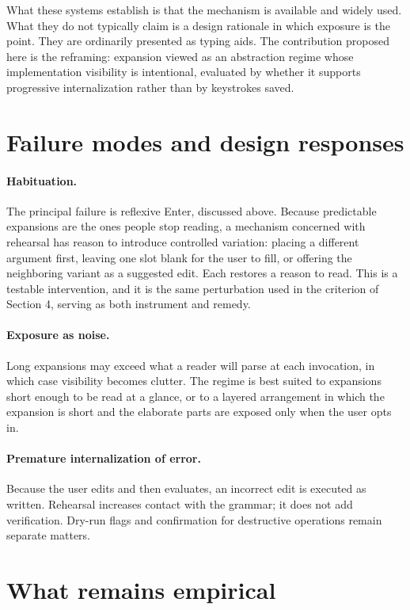 \documentclass[11pt]{article}
\theoremstyle{remark}
\begin{document}
What these systems establish is that the mechanism is available and widely used. What they do not typically claim is a design rationale in which exposure is the point. They are ordinarily presented as typing aids. The contribution proposed here is the reframing: expansion viewed as an abstraction regime whose implementation visibility is intentional, evaluated by whether it supports progressive internalization rather than by keystrokes saved.

\section{Failure modes and design responses}

\paragraph{Habituation.} The principal failure is reflexive Enter, discussed above. Because predictable expansions are the ones people stop reading, a mechanism concerned with rehearsal has reason to introduce controlled variation: placing a different argument first, leaving one slot blank for the user to fill, or offering the neighboring variant as a suggested edit. Each restores a reason to read. This is a testable intervention, and it is the same perturbation used in the criterion of Section 4, serving as both instrument and remedy.

\paragraph{Exposure as noise.} Long expansions may exceed what a reader will parse at each invocation, in which case visibility becomes clutter. The regime is best suited to expansions short enough to be read at a glance, or to a layered arrangement in which the expansion is short and the elaborate parts are exposed only when the user opts in.

\paragraph{Premature internalization of error.} Because the user edits and then evaluates, an incorrect edit is executed as written. Rehearsal increases contact with the grammar; it does not add verification. Dry-run flags and confirmation for destructive operations remain separate matters.

\section{What remains empirical}
\end{document}
